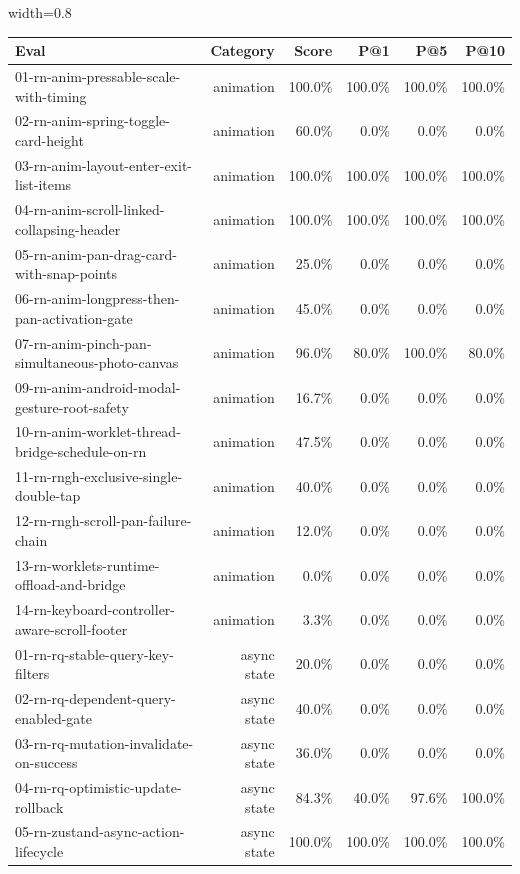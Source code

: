 \begin{table}[htbp]
\centering
\begin{adjustbox}{width=0.8\textwidth}
\begin{tabular}{lrrrrr}
\toprule
Eval & Category & Score & P@1 & P@5 & P@10 \\
\midrule
01-rn-anim-pressable-scale-with-timing & animation & 100.0\% & 100.0\% & 100.0\% & 100.0\% \\
02-rn-anim-spring-toggle-card-height & animation & 60.0\% & 0.0\% & 0.0\% & 0.0\% \\
03-rn-anim-layout-enter-exit-list-items & animation & 100.0\% & 100.0\% & 100.0\% & 100.0\% \\
04-rn-anim-scroll-linked-collapsing-header & animation & 100.0\% & 100.0\% & 100.0\% & 100.0\% \\
05-rn-anim-pan-drag-card-with-snap-points & animation & 25.0\% & 0.0\% & 0.0\% & 0.0\% \\
06-rn-anim-longpress-then-pan-activation-gate & animation & 45.0\% & 0.0\% & 0.0\% & 0.0\% \\
07-rn-anim-pinch-pan-simultaneous-photo-canvas & animation & 96.0\% & 80.0\% & 100.0\% & 80.0\% \\
09-rn-anim-android-modal-gesture-root-safety & animation & 16.7\% & 0.0\% & 0.0\% & 0.0\% \\
10-rn-anim-worklet-thread-bridge-schedule-on-rn & animation & 47.5\% & 0.0\% & 0.0\% & 0.0\% \\
11-rn-rngh-exclusive-single-double-tap & animation & 40.0\% & 0.0\% & 0.0\% & 0.0\% \\
12-rn-rngh-scroll-pan-failure-chain & animation & 12.0\% & 0.0\% & 0.0\% & 0.0\% \\
13-rn-worklets-runtime-offload-and-bridge & animation & 0.0\% & 0.0\% & 0.0\% & 0.0\% \\
14-rn-keyboard-controller-aware-scroll-footer & animation & 3.3\% & 0.0\% & 0.0\% & 0.0\% \\
01-rn-rq-stable-query-key-filters & async state & 20.0\% & 0.0\% & 0.0\% & 0.0\% \\
02-rn-rq-dependent-query-enabled-gate & async state & 40.0\% & 0.0\% & 0.0\% & 0.0\% \\
03-rn-rq-mutation-invalidate-on-success & async state & 36.0\% & 0.0\% & 0.0\% & 0.0\% \\
04-rn-rq-optimistic-update-rollback & async state & 84.3\% & 40.0\% & 97.6\% & 100.0\% \\
05-rn-zustand-async-action-lifecycle & async state & 100.0\% & 100.0\% & 100.0\% & 100.0\% \\

\end{tabular}
\end{adjustbox}
\end{table}
